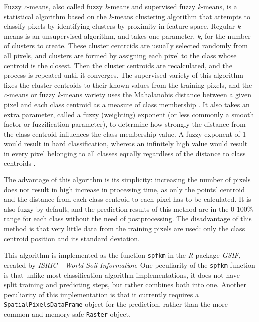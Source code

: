 \documentclass[a4paper,12pt]{scrbook}
\begin{document}
Fuzzy \textit{c}-means, also called fuzzy \textit{k}-means and supervised fuzzy \textit{k}-means, is a statistical algorithm based on the \textit{k}-means clustering algorithm that attempts to classify pixels by identifying clusters by proximity in feature space. Regular \textit{k}-means is an unsupervised algorithm, and takes one parameter, \textit{k}, for the number of clusters to create. These cluster centroids are usually selected randomly from all pixels, and clusters are formed by assigning each pixel to the class whose centroid is the closest. Then the cluster centroids are recalculated, and the process is repeated until it converges. The supervised variety of this algorithm fixes the cluster centroids to their known values from the training pixels, and the \textit{c}-means or fuzzy \textit{k}-means variety uses the Mahalanobis distance between a given pixel and each class centroid as a measure of class membership \citep{hengl2004fuzzycmeans}. It also takes an extra parameter, called a fuzzy (weighting) exponent (or less commonly a smooth factor or fuzzification parameter), to determine how strongly the distance from the class centroid influences the class membership value. A fuzzy exponent of 1 would result in hard classification, whereas an infinitely high value would result in every pixel belonging to all classes equally regardless of the distance to class centroids \citep{Okeke2006fuzzyexponent}.

The advantage of this algorithm is its simplicity: increasing the number of pixels does not result in high increase in processing time, as only the points' centroid and the distance from each class centroid to each pixel has to be calculated. It is also fuzzy by default, and the prediction results of this method are in the 0-100\% range for each class without the need of postprocessing. The disadvantage of this method is that very little data from the training pixels are used: only the class centroid position and its standard deviation.

This algorithm is implemented as the function \texttt{spfkm} in the \textit{R} package \textit{GSIF}, created by \textit{ISRIC - World Soil Information}. One peculiarity of the \texttt{spfkm} function is that unlike most classification algorithm implementations, it does not have split training and predicting steps, but rather combines both into one. Another peculiarity of this implementation is that it currently requires a \texttt{SpatialPixelsDataFrame} object for the prediction, rather than the more common and memory-safe \texttt{Raster} object.
\end{document}
